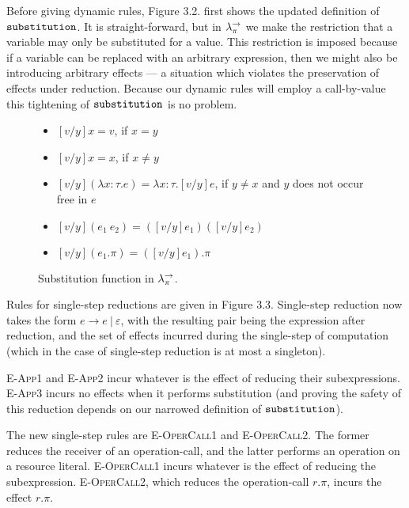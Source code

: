 Before giving dynamic rules, Figure 3.2. first shows the updated definition of $\mathtt{substitution}$. It is straight-forward, but in $\lambda^{\rightarrow}_{\pi}$ we make the restriction that a variable may only be substituted for a value. This restriction is imposed because if a variable can be replaced with an arbitrary expression, then we might also be introducing arbitrary effects --- a situation which violates the preservation of effects under reduction. Because our dynamic rules will employ a call-by-value this tightening of $\mathtt{substitution}$ is no problem.
 \\


\begin{figure}[h]


\begin{itemize}
	\setlength\itemsep{-0.7em}
	\item[] $[v/y]x = v$, if $x = y$
	\item[] $[v/y]x = x$, if $x \neq y$
	\item[] $[v/y](\lambda x: \tau. e) = \lambda x: \tau.[v/y]e$, if $y \neq x$ and $y$ does not occur free in $e$
	\item[] $[v/y](e_1~e_2) = ([v/y]e_1)([v/y]e_2)$
	\item[] $[v/y](e_1.\pi) = ([v/y]e_1).\pi$
\end{itemize}

\vspace{-7pt}
\caption{Substitution function in $\lambda^{\rightarrow}_{\pi}$.}
\label{This is the label.}
\end{figure}

Rules for single-step reductions are given in Figure 3.3. Single-step reduction now takes the form $e \longrightarrow e~|~\varepsilon$, with the resulting pair being the expression after reduction, and the set of effects incurred during the single-step of computation (which in the case of single-step reduction is at most a singleton).

\textsc{E-App1} and \textsc{E-App2} incur whatever is the effect of reducing their subexpressions. \textsc{E-App3} incurs no effects when it performs substitution (and proving the safety of this reduction depends on our narrowed definition of $\mathtt{substitution}$).

The new single-step rules are \textsc{E-OperCall1} and \textsc{E-OperCall2}. The former reduces the receiver of an operation-call, and the latter performs an operation on a resource literal. \textsc{E-OperCall1} incurs whatever is the effect of reducing the subexpression. \textsc{E-OperCall2}, which reduces the operation-call $r.\pi$, incurs the effect $r.\pi$.

